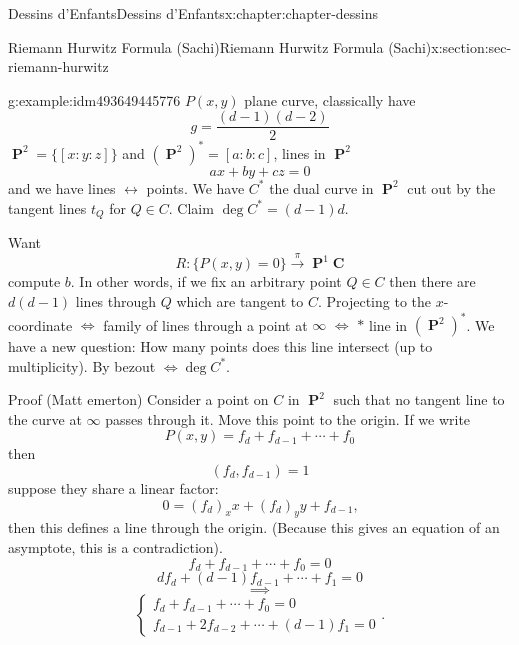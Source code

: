 \documentclass[oneside,10pt,]{book}
\numberwithin{equation}{section}
\newcommand{\lb}{[}
\newcommand{\rb}{]}
\newcommand{\CC}{\mathbf{C}}
\DeclareMathOperator{\PP}{\mathbf{P}}
\begin{document}
\begin{chapterptx}{Dessins d'Enfants}{}{Dessins d'Enfants}{}{}{x:chapter:chapter-dessins}
\begin{sectionptx}{Riemann Hurwitz Formula (Sachi)}{}{Riemann Hurwitz Formula (Sachi)}{}{}{x:section:sec-riemann-hurwitz}
\begin{example}{}{g:example:idm493649445776}%
\(P(x,y)\) plane curve, classically have%
\begin{equation*}
g = \frac{(d-1)(d-2)}{2}
\end{equation*}
\(\PP^2 = \{ \lb x:y:z \rb\}\) and \((\PP^2)^* = \lb a:b:c \rb\), lines in \(\PP^2\)%
\begin{equation*}
ax + by + cz = 0
\end{equation*}
and we have lines \(\leftrightarrow\) points. We have \(C^*\) the dual curve in \(\PP^2\) cut out by the tangent lines \(t_Q\) for \(Q \in C\). Claim \(\deg C^* = (d-1)d\).%
\par
Want%
\begin{equation*}
R:\{P(x,y) = 0\} \xrightarrow\pi \PP^1\CC
\end{equation*}
compute \(b\). In other words, if we fix an arbitrary point \(Q\in C\) then there are \(d(d-1)\) lines through \(Q\) which are tangent to \(C\). Projecting to the \(x\)-coordinate \(\iff\) family of lines through a point at \(\infty\) \(\iff\) \(\ast\) line in \((\PP^2)^*\). We have a new question: How many points does this line intersect (up to multiplicity). By bezout \(\iff  \deg C^*\).%
\par
Proof (Matt emerton) Consider a point on \(C\) in \(\PP^2\) such that no tangent line to the curve at   \(\infty\) passes through it. Move this point to the origin. If we write%
\begin{equation*}
P(x,y) = f_d + f_{d-1} + \cdots + f_0
\end{equation*}
then%
\begin{equation*}
(f_d, f_{d-1}) = 1
\end{equation*}
suppose they share a linear factor:%
\begin{equation*}
0 = (f_d)_x x + (f_d)_y y + f_{d-1}\text{,}
\end{equation*}
then this defines a line through the origin. (Because this gives an equation of an asymptote, this is a contradiction).%
\begin{equation*}
f_d + f_{d-1} + \cdots + f_0 = 0
\end{equation*}
%
\begin{equation*}
d f_d + (d-1) f_{d-1} + \cdots + f_1 = 0
\end{equation*}
%
\begin{equation*}
\implies
\end{equation*}
%
\begin{equation*}
\begin{cases}  f_d + f_{d-1} + \cdots + f_0 = 0 \\ f_{d-1} + 2f_{d-2} + \cdots + (d-1) f_1 = 0\end{cases}\text{.}

\end{equation*}
\end{example}
\end{sectionptx}
\end{chapterptx}
\end{document}
